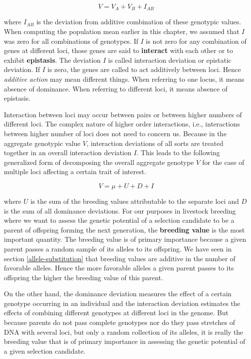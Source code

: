 \documentclass[
]{book}
\theoremstyle{definition}
\theoremstyle{definition}
\theoremstyle{definition}
\theoremstyle{remark}
\begin{document}
\begin{equation}
V = V_A + V_B + I_{AB}
\label{eq:AggregateGenotypicValueTwoLoci}
\end{equation}

where \(I_{AB}\) is the deviation from additive combination of these genotypic values. When computing the population mean earlier in this chapter, we assumed that \(I\) was zero for all combinations of genotypes. If \(I\) is not zero for any combination of genes at different loci, those genes are said to \textbf{interact} with each other or to exhibit \textbf{epistasis}. The deviation \(I\) is called interaction deviation or epistatic deviation. If \(I\) is zero, the genes are called to act additively between loci. Hence \emph{additive action} may mean different things. When referring to one locus, it means absence of dominance. When referring to different loci, it means absence of epistasis.

Interaction between loci may occur between pairs or between higher numbers of different loci. The complex nature of higher order interactions, i.e., interactions between higher number of loci does not need to concern us. Because in the aggregate genotypic value \(V\), interaction deviations of all sorts are treated together in an overall interaction deviation \(I\). This leads to the following generalized form of decomposing the overall aggregate genotype \(V\) for the case of multiple loci affecting a certain trait of interest.

\begin{equation}
V = \mu + U + D + I
\label{eq:AggregateGenotypicValueMultipleLoci}
\end{equation}

where \(U\) is the sum of the breeding values attributable to the separate loci and \(D\) is the sum of all dominance deviations. For our purposes in livestock breeding where we want to assess the genetic potential of a selection candidate to be a parent of offspring forming the next generation, the \textbf{breeding value} is the most important quantity. The breeding value is of primary importance because a given parent passes a random sample of its alleles to its offspring. We have seen in section \ref{allele-substitution} that breeding values are additive in the number of favorable alleles. Hence the more favorable alleles a given parent passes to its offspring the higher the breeding value of this parent.

On the other hand, the dominance deviation measures the effect of a certain genotype occurring in an individual and the interaction deviation estimates the effects of combining different genotypes at different loci in the genome. But because parents do not pass complete genotypes nor do they pass stretches of DNA with several loci, but only a random collection of its alleles, it is really the breeding value that is of primary importance in assessing the genetic potential of a given selection candidate.
\end{document}
